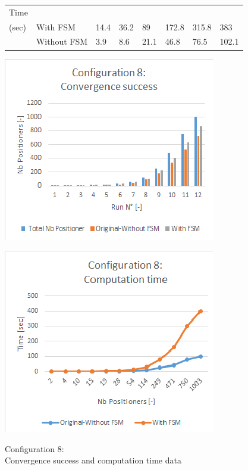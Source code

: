 \documentclass[]{spie}  %
\begin{document}
\begin{figure}[H]
\begin{minipage}{8.7cm}
{\begin{tabular}{|l|l|l|l|l|l|l|l|}
				\hline
				Time\\(sec) & With FSM  & 14.4 & 36.2  & 89 & 172.8 & 315.8 & 383 \\
				\cline{2-8}
				& Without FSM  & 3.9  & 8.6 & 21.1 & 46.8 & 76.5  & 102.1 \\
				\hline
			\end{tabular}
			}
		\label{configuration7_result} 
		\end{minipage}
		\begin{minipage}{9cm}
			\begin{minipage}[t]{4.2cm}
				\includegraphics[scale=0.56]{images/configuration8_conv}
				\label{configuration1_conv}
			\end{minipage}
			\begin{minipage}[t]{1.0cm}
				\includegraphics[scale=0.56]{images/configuration8_time}
				\label{configuration1_time}
			\end{minipage}
			\caption{\centering Configuration 8:\\
				Convergence success and computation time data
}
\end{minipage}
\end{figure}
\end{document}
